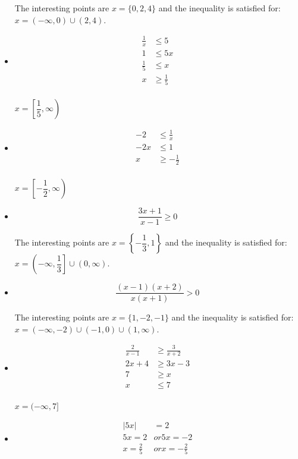 \documentclass[fleqn,addpoints]{exam}
\begin{document}
\begin{itemize}
The interesting points are $x=\{ 0, 2, 4\}$ and the inequality is satisfied for: $x = (-\infty, 0) \cup (2, 4)$.

\item[19]
\begin{align*}
  \frac{1}{x} & \leq 5 \\
  1 & \leq 5x \\
  \frac{1}{5} & \leq x \\
  x &\geq \frac{1}{5} \\
\end{align*}

$x = \left[ \dfrac{1}{5}, \infty \right)$

\item[20]
\begin{align*}
  -2 & \leq \frac{1}{x} \\
  -2x & \leq 1 \\
  x & \geq -\frac{1}{2} \\
\end{align*}

$x = \left[ -\dfrac{1}{2}, \infty \right)$

\item[21]
\[
  \frac{3x+1}{x-1} \geq 0
\]

The interesting points are $x= \left \{ -\dfrac{1}{3}, 1 \right \}$ and the inequality is satisfied for: 
$x = \left(-\infty, \dfrac{1}{3} \right] \cup (0, \infty)$.

\item[22]
\[
  \frac{(x-1)(x+2)} {x(x+1)} > 0
\]

The interesting points are $x= \{1, -2, -1 \}$ and the inequality is satisfied for: 
$x = (-\infty, -2) \cup (-1, 0) \cup (1, \infty)$.

\item[23]
\begin{align*}
  \frac{2}{x-1} & \geq \frac{3}{x+2} \\
  2x+4 & \geq 3x - 3 \\
  7 & \geq x \\
  x & \leq 7 \\
\end{align*}

$x = (-\infty, 7]$

\item[25]
\begin{align*}
  |5x| &= 2 \\
  5x = 2 & or 5x = -2 \\
  x = \frac{2}{5} & or x = -\frac{2}{5} \\
\end{align*}


\end{itemize}
\end{document}
